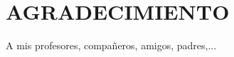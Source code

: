 \chapter*{\flushright AGRADECIMIENTO}
\doublespacing
\begin{flushright}
       A mis profesores, compañeros, amigos, padres,...
\end{flushright}
